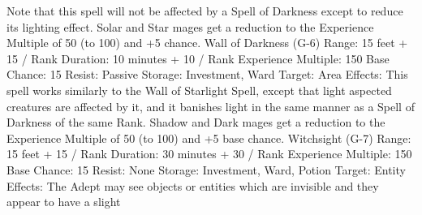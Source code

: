 \documentclass[a4paper]{article}
\begin{document}
\begin{multicols}{3}
Note that this spell will not be affected by a Spell
of Darkness except to reduce its lighting effect.
Solar and Star mages get a reduction to the Experience Multiple of 50 (to 100) and +5%
chance.
Wall of Darkness (G-6)
Range: 15 feet + 15 / Rank
Duration: 10 minutes + 10 / Rank
Experience Multiple: 150
Base Chance: 15%
Resist: Passive
Storage: Investment, Ward
Target: Area
Effects: This spell works similarly to the Wall of
Starlight Spell, except that light aspected creatures
are affected by it, and it banishes light in the same
manner as a Spell of Darkness of the same Rank.
Shadow and Dark mages get a reduction to the
Experience Multiple of 50 (to 100) and +5%
base chance.
Witchsight (G-7)
Range: 15 feet + 15 / Rank
Duration: 30 minutes + 30 / Rank
Experience Multiple: 150
Base Chance: 15%
Resist: None
Storage: Investment, Ward, Potion
Target: Entity
Effects: The Adept may see objects or entities
which are invisible and they appear to have a slight


\end{multicols}
\end{document}

